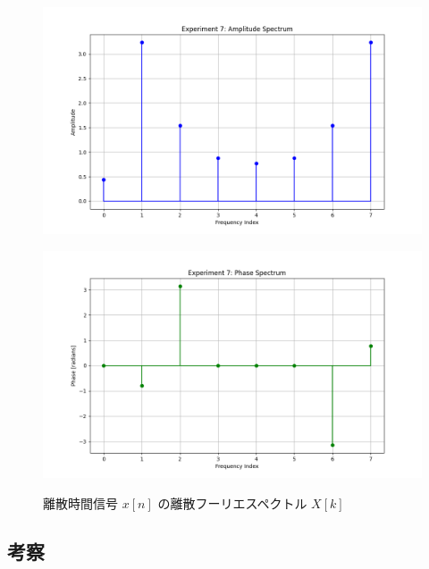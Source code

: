 \documentclass[fleqn, a4paper. 12pt]{jsarticle}
\begin{document}
  \begin{figure}[h]
    \begin{center}
    \begin{minipage}[t]{0.48\columnwidth}
        \includegraphics[width=\columnwidth]{amplitude_spectrum_experiment_7.png}
        \label{fign:a7}
    \end{minipage}
    \begin{minipage}[t]{0.48\columnwidth}
        \includegraphics[width=\columnwidth]{phase_spectrum_experiment_7.png}
        \label{fign:p7}
    \end{minipage}
    \end{center}
    \caption{離散時間信号 $x[n]$ の離散フーリエスペクトル $X[k]$}
  \end{figure}

  \subsection*{考察}
\end{document}
